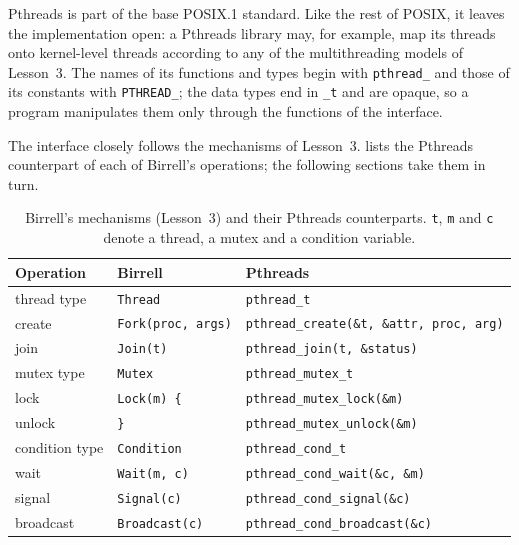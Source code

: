 \documentclass[../main.tex]{subfiles}
\begin{document}
Pthreads is part of the base POSIX.1 standard.  Like the rest of POSIX, it
leaves the implementation open: a Pthreads library may, for example, map its
threads onto kernel-level threads according to any of the multithreading
models of Lesson~3.  The names of its functions and types begin
with \texttt{pthread\_} and those of its constants with
\texttt{PTHREAD\_}; the
data types end in \texttt{\_t} and are opaque, so a program manipulates them
only through the functions of the interface.

The interface closely follows the mechanisms of Lesson~3.
 lists the Pthreads counterpart of each of Birrell's
operations; the following sections take them in turn.

\begin{table}[htbp]
  \centering
  \caption{Birrell's mechanisms (Lesson~3) and their Pthreads counterparts.
    \texttt{t}, \texttt{m} and \texttt{c} denote a thread, a mutex and a
    condition variable.}
  \label{tab:l04-birrell}
  \small
  \setlength{\tabcolsep}{5pt}
  \begin{tabular}{@{}lll@{}}
    \toprule
    Operation & Birrell & Pthreads \\
    \midrule
    thread type    & \texttt{Thread}           & \texttt{pthread\_t} \\
    create         & \texttt{Fork(proc, args)}
                   & \texttt{pthread\_create(\&t, \&attr, proc, arg)} \\
    join           & \texttt{Join(t)}          & \texttt{pthread\_join(t, \&status)} \\
    \midrule
    mutex type     & \texttt{Mutex}            & \texttt{pthread\_mutex\_t} \\
    lock           & \texttt{Lock(m) \{}       & \texttt{pthread\_mutex\_lock(\&m)} \\
    unlock         & \texttt{\}}               & \texttt{pthread\_mutex\_unlock(\&m)} \\
    \midrule
    condition type & \texttt{Condition}        & \texttt{pthread\_cond\_t} \\
    wait           & \texttt{Wait(m, c)}       & \texttt{pthread\_cond\_wait(\&c, \&m)} \\
    signal         & \texttt{Signal(c)}        & \texttt{pthread\_cond\_signal(\&c)} \\
    broadcast      & \texttt{Broadcast(c)}     & \texttt{pthread\_cond\_broadcast(\&c)} \\
    \bottomrule
  \end{tabular}
\end{table}
\end{document}
